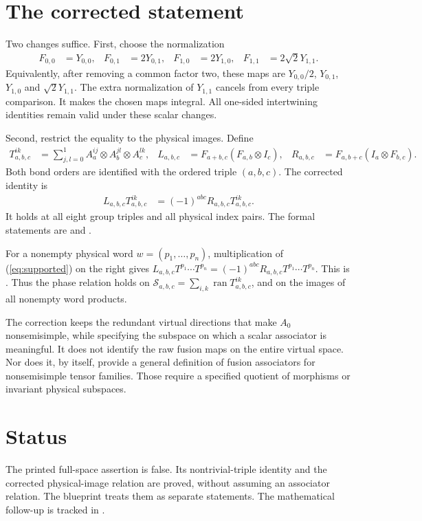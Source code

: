 \documentclass[11pt]{article}
\begin{document}
\section{The corrected statement}

Two changes suffice. First, choose the normalization
\begin{align}
 F_{0,0}&=Y_{0,0},&F_{0,1}&=2Y_{0,1},&
 F_{1,0}&=2Y_{1,0},&F_{1,1}&=2\sqrt2Y_{1,1}.
 \label{eq:normalization}
\end{align}
Equivalently, after removing a common factor two, these maps are
$Y_{0,0}/2$, $Y_{0,1}$, $Y_{1,0}$ and $\sqrt2Y_{1,1}$.
The extra normalization of $Y_{1,1}$ cancels from every triple comparison.
It makes the chosen maps integral. All one-sided intertwining identities
remain valid under these scalar changes.

Second, restrict the equality to the physical images. Define
\begin{align}
 T_{a,b,c}^{ik}
 &=\sum_{j,l=0}^1 A_a^{ij}\otimes A_b^{jl}\otimes A_c^{lk},&
 L_{a,b,c}&=F_{a+b,c}(F_{a,b}\otimes I_c),&
 R_{a,b,c}&=F_{a,b+c}(I_a\otimes F_{b,c}).
 \label{eq:three-layer}
\end{align}
Both bond orders are identified with the ordered triple $(a,b,c)$.
The corrected identity is
\begin{align}
 L_{a,b,c}T_{a,b,c}^{ik}
 &=(-1)^{abc}R_{a,b,c}T_{a,b,c}^{ik}.
 \label{eq:supported}
\end{align}
It holds at all eight group triples and all physical index pairs.
The formal statements are
 and
.

For a nonempty physical word $w=(p_1,\ldots,p_n)$, multiplication of
(\ref{eq:supported}) on the right gives
$L_{a,b,c}T^{p_1}\cdots T^{p_n}
=(-1)^{abc}R_{a,b,c}T^{p_1}\cdots T^{p_n}$.
This is .
Thus the phase relation holds on
$\mathcal S_{a,b,c}=\sum_{i,k}\operatorname{ran}T_{a,b,c}^{ik}$,
and on the images of all nonempty word products.

The correction keeps the redundant virtual directions that make $A_0$
nonsemisimple, while specifying the subspace on which a scalar associator
is meaningful. It does not identify the raw fusion maps on the entire
virtual space. Nor does it, by itself, provide a general definition of
fusion associators for nonsemisimple tensor families. Those require a
specified quotient of morphisms or invariant physical subspaces.

\section{Status}

The printed full-space assertion is false. Its nontrivial-triple identity
and the corrected physical-image relation are proved, without assuming
an associator relation. The blueprint treats them as separate statements.
The mathematical follow-up is tracked in .
\end{document}
